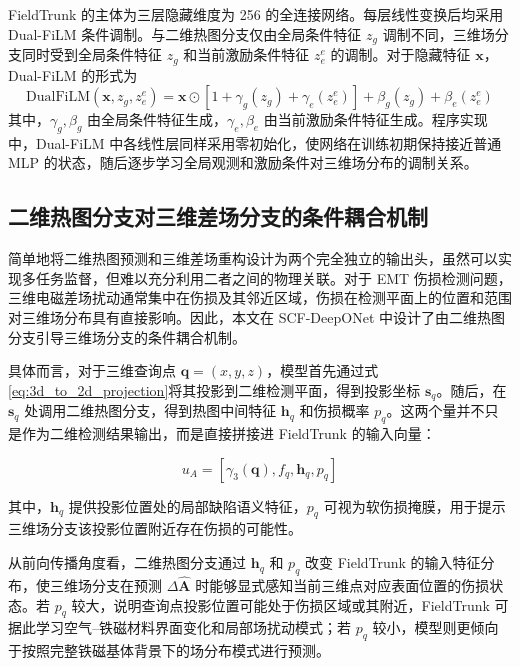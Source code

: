 FieldTrunk 的主体为三层隐藏维度为 256 的全连接网络。每层线性变换后均采用 Dual-FiLM 条件调制。与二维热图分支仅由全局条件特征 $z_g$ 调制不同，三维场分支同时受到全局条件特征 $z_g$ 和当前激励条件特征 $z_e^e$ 的调制。对于隐藏特征 $\mathbf x$，Dual-FiLM 的形式为
\begin{equation}
\label{eq:dual_film}
\mathrm{DualFiLM}(\mathbf x,z_g,z_e^e)
=
\mathbf x\odot
\left[
1+\gamma_g(z_g)+\gamma_e(z_e^e)
\right]
+
\beta_g(z_g)+\beta_e(z_e^e)
\end{equation}
其中，$\gamma_g,\beta_g$ 由全局条件特征生成，$\gamma_e,\beta_e$ 由当前激励条件特征生成。程序实现中，Dual-FiLM 中各线性层同样采用零初始化，使网络在训练初期保持接近普通 MLP 的状态，随后逐步学习全局观测和激励条件对三维场分布的调制关系。

\subsection{二维热图分支对三维差场分支的条件耦合机制}
\label{subsec:heat_field_coupling}

简单地将二维热图预测和三维差场重构设计为两个完全独立的输出头，虽然可以实现多任务监督，但难以充分利用二者之间的物理关联。对于 EMT 伤损检测问题，三维电磁差场扰动通常集中在伤损及其邻近区域，伤损在检测平面上的位置和范围对三维场分布具有直接影响。因此，本文在 SCF-DeepONet 中设计了由二维热图分支引导三维场分支的条件耦合机制。

具体而言，对于三维查询点 $\mathbf q=(x,y,z)$，模型首先通过式\eqref{eq:3d_to_2d_projection}将其投影到二维检测平面，得到投影坐标 $\mathbf s_q$。随后，在 $\mathbf s_q$ 处调用二维热图分支，得到热图中间特征 $\mathbf h_q$ 和伤损概率 $p_q$。这两个量并不只是作为二维检测结果输出，而是直接拼接进 FieldTrunk 的输入向量：

\begin{equation}
\label{eq:u_A_with_heatmap}
u_A
=
[
\gamma_3(\mathbf q),
f_q,
\mathbf h_q,
p_q
]
\end{equation}

其中，$\mathbf h_q$ 提供投影位置处的局部缺陷语义特征，$p_q$ 可视为软伤损掩膜，用于提示三维场分支该投影位置附近存在伤损的可能性。

从前向传播角度看，二维热图分支通过 $\mathbf h_q$ 和 $p_q$ 改变 FieldTrunk 的输入特征分布，使三维场分支在预测 $\Delta \hat{\mathbf A}$ 时能够显式感知当前三维点对应表面位置的伤损状态。若 $p_q$ 较大，说明查询点投影位置可能处于伤损区域或其附近，FieldTrunk 可据此学习空气--铁磁材料界面变化和局部场扰动模式；若 $p_q$ 较小，模型则更倾向于按照完整铁磁基体背景下的场分布模式进行预测。

